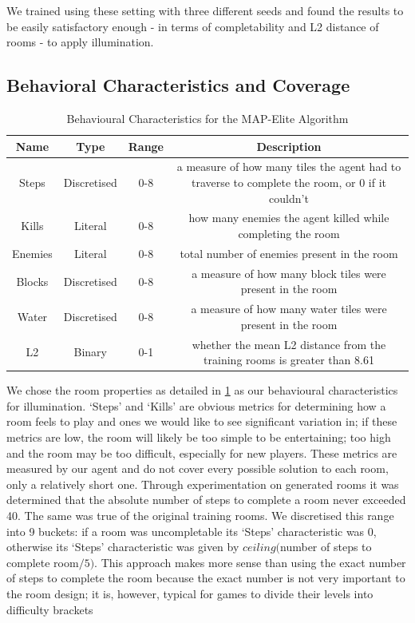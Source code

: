 \documentclass{article}
\begin{document}
We trained using these setting with three different seeds and found the results to be easily satisfactory enough - in terms of completability and L2 distance of rooms - to apply illumination.


\subsection{Behavioral Characteristics and Coverage}

\begin{table}
\begin{center}
\small
    \begin{tabular}{c|c|c|c}
         \hline
         Name & Type & Range & Description\\ \hline
         Steps & Discretised & 0-8 & a measure of how many tiles the agent had to traverse to complete the room, or 0 if it couldn't \\
         Kills & Literal & 0-8 & how many enemies the agent killed while completing the room\\
         Enemies & Literal & 0-8 & total number of enemies present in the room\\
         Blocks & Discretised & 0-8 & a measure of how many block tiles were present in the room\\
         Water & Discretised & 0-8 & a measure of how many water tiles were present in the room \\
         L2 & Binary & 0-1 & whether the mean L2 distance from the training rooms is greater than 8.61\\
         \hline
    \end{tabular}
\end{center}
\caption{Behavioural Characteristics for the MAP-Elite Algorithm}
\label{table:bcs}
\end{table}

We chose the room properties as detailed in \ref{table:bcs} as our behavioural characteristics for illumination. `Steps' and `Kills' are obvious metrics for determining how a room feels to play and ones we would like to see significant variation in; if these metrics are low, the room will likely be too simple to be entertaining; too high and the room may be too difficult, especially for new players. These metrics are measured by our agent and do not cover every possible solution to each room, only a relatively short one. Through experimentation on generated rooms it was determined that the absolute number of steps to complete a room never exceeded 40. The same was true of the original training rooms. We discretised this range into 9 buckets: if a room was uncompletable its `Steps' characteristic was 0, otherwise its `Steps' characteristic was given by $ceiling($number of steps to complete room$ / 5)$. This approach makes more sense than using the exact number of steps to complete the room because the exact number is not very important to the room design; it is, however, typical for games to divide their levels into difficulty brackets 
\end{document}
